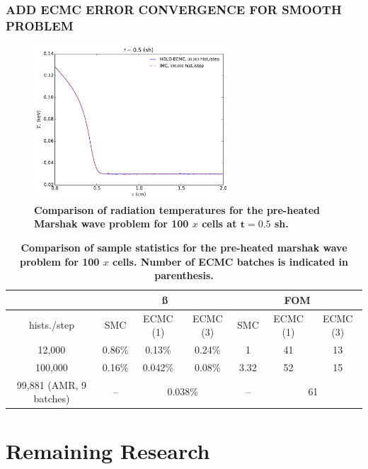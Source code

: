 \documentclass[xcolor=dvipsnames,hyperref={pdfpagelabels=false},unknownkeysallowed]{beamer}
\begin{document}
\begin{frame}
    \frametitle{ADD ECMC ERROR CONVERGENCE FOR SMOOTH PROBLEM}
\begin{figure}[htb]
  \centering
    \includegraphics[width=0.65\textwidth]{heated_marshak.pdf}
    \caption{\label{hot_plot}\bf Comparison of radiation temperatures for the pre-heated Marshak wave problem for 100
    $x$ cells at $\mathbf{t=0.5}$ sh.}
\end{figure}


\begin{table}[H]
\centering
\caption{\label{preheat_var} \textbf{Comparison of sample statistics for the 
    pre-heated marshak wave problem for 100 $x$ cells. Number of ECMC batches is
indicated in parenthesis.}}
\vspace{-0.1in}
\begin{tabular}{|c|ccc|ccc|}\cline{2-7}
    \multicolumn{1}{c|}{}       & \multicolumn{3}{|c|}{\ss} &
    \multicolumn{3}{|c|}{FOM} \\ \hline
hists./step   & SMC & ECMC (1) & ECMC (3)  & SMC & ECMC (1) & ECMC (3)   \\ \hline
   12,000	  & 0.86\%   & 0.13\% & 0.24\% & 1      & 41  & 13      \\
  100,000     & 0.16\%   & 0.042\% & 0.08\% & 3.32   & 52  & 15       \\ 
  99,881 (AMR, 9 batches) & --  & \multicolumn{2}{c|}{ 0.038\%} & -- &
  \multicolumn{2}{c|}{61}               \\ \hline
\end{tabular}
\end{table}

\end{frame}


\section{Remaining Research}
\end{document}
